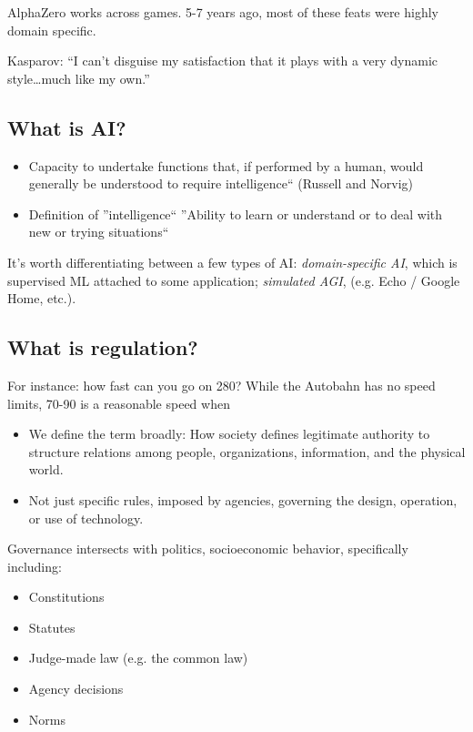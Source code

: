 \documentclass{article}
\begin{document}
AlphaZero works across games.  5-7 years ago, most of these feats were highly domain specific.

Kasparov: ``I can't disguise my satisfaction that it plays with a very dynamic style\dots much like my own.''

\subsection{What is AI?}

\begin{itemize}
  \item Capacity to undertake functions that, if performed by a human, would generally be understood to require intelligence`` (Russell and Norvig)
  \item Definition of ''intelligence``  ''Ability to learn or understand or to deal with new or trying situations``
\end{itemize}

It's worth differentiating between a few types of AI: {\it domain-specific AI}, which is supervised ML attached to some application; {\it simulated AGI}, (e.g. Echo / Google Home, etc.).

\subsection{What is regulation?}

For instance: how fast can you go on 280?  While the Autobahn has no speed limits, 70-90 is a reasonable speed when 

\begin{itemize}
  \item We define the term broadly: How society defines legitimate authority to structure relations among people, organizations, information, and the physical world.
  \item Not just specific rules, imposed by agencies, governing the design, operation, or use of technology.
\end{itemize}

Governance intersects with politics, socioeconomic behavior, specifically including:
\begin{itemize}
  \item Constitutions
  \item Statutes
  \item Judge-made law (e.g. the common law)
  \item Agency decisions
  \item Norms
\end{itemize}
\end{document}
